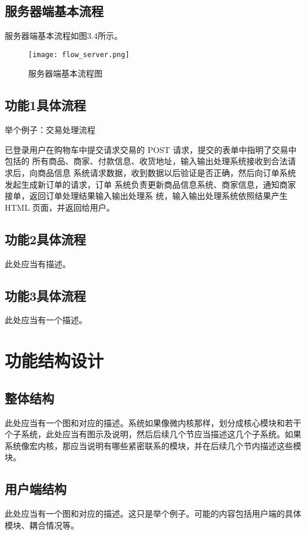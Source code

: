 \subsection{服务器端基本流程}
服务器端基本流程如图3.4所示。
\begin{figure}
\centering
\texttt{[image: flow\_server.png]}
\caption{服务器端基本流程图}\label{fig:noted-figure}
\end{figure} 



\subsection{功能1具体流程}
举个例子：交易处理流程

已登录用户在购物车中提交请求交易的 POST 请求，提交的表单中指明了交易中包括的
所有商品、商家、付款信息、收货地址，输入输出处理系统接收到合法请求后，向商品信息
系统请求数据，收到数据以后验证是否正确，然后向订单系统发起生成新订单的请求，订单
系统负责更新商品信息系统、商家信息，通知商家接单，返回订单处理结果输入输出处理系
统，输入输出处理系统依照结果产生 HTML 页面，并返回给用户。

\subsection{功能2具体流程}
此处应当有描述。

\subsection{功能3具体流程}
此处应当有一个描述。



\section{功能结构设计}
\subsection{整体结构}
此处应当有一个图和对应的描述。系统如果像微内核那样，划分成核心模块和若干个子系统，此处应当有图示及说明，然后后续几个节应当描述这几个子系统。如果系统像宏内核，那应当说明有哪些紧密联系的模块，并在后续几个节内描述这些模块。

\subsection{用户端结构}
此处应当有一个图和对应的描述。这只是举个例子。可能的内容包括用户端的具体模块、耦合情况等。


